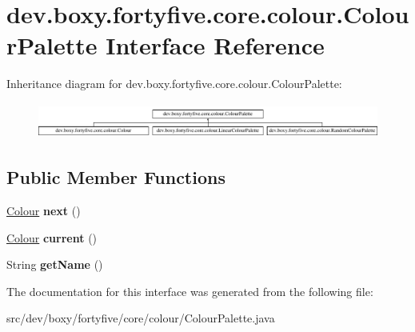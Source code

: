 \hypertarget{interfacedev_1_1boxy_1_1fortyfive_1_1core_1_1colour_1_1_colour_palette}{
\section{dev.boxy.fortyfive.core.colour.ColourPalette Interface Reference}
\label{d4/d31/interfacedev_1_1boxy_1_1fortyfive_1_1core_1_1colour_1_1_colour_palette}
}
Inheritance diagram for dev.boxy.fortyfive.core.colour.ColourPalette:\begin{figure}[H]
\begin{center}
\leavevmode
\includegraphics[height=1.174004cm]{d4/d31/interfacedev_1_1boxy_1_1fortyfive_1_1core_1_1colour_1_1_colour_palette}
\end{center}
\end{figure}
\subsection*{Public Member Functions}
\begin{DoxyCompactItemize}
\item 
\hypertarget{interfacedev_1_1boxy_1_1fortyfive_1_1core_1_1colour_1_1_colour_palette_a1148b143dcdcb5f42a1b0d2f1d918ccb}{
\hyperlink{classdev_1_1boxy_1_1fortyfive_1_1core_1_1colour_1_1_colour}{Colour} {\bfseries next} ()}
\label{d4/d31/interfacedev_1_1boxy_1_1fortyfive_1_1core_1_1colour_1_1_colour_palette_a1148b143dcdcb5f42a1b0d2f1d918ccb}

\item 
\hypertarget{interfacedev_1_1boxy_1_1fortyfive_1_1core_1_1colour_1_1_colour_palette_aea49cf29ebb305f8ce8fd5f07c46b7ed}{
\hyperlink{classdev_1_1boxy_1_1fortyfive_1_1core_1_1colour_1_1_colour}{Colour} {\bfseries current} ()}
\label{d4/d31/interfacedev_1_1boxy_1_1fortyfive_1_1core_1_1colour_1_1_colour_palette_aea49cf29ebb305f8ce8fd5f07c46b7ed}

\item 
\hypertarget{interfacedev_1_1boxy_1_1fortyfive_1_1core_1_1colour_1_1_colour_palette_a8abaf18318308a945b8e843b0f68da41}{
String {\bfseries getName} ()}
\label{d4/d31/interfacedev_1_1boxy_1_1fortyfive_1_1core_1_1colour_1_1_colour_palette_a8abaf18318308a945b8e843b0f68da41}

\end{DoxyCompactItemize}


The documentation for this interface was generated from the following file:\begin{DoxyCompactItemize}
\item 
src/dev/boxy/fortyfive/core/colour/ColourPalette.java\end{DoxyCompactItemize}
